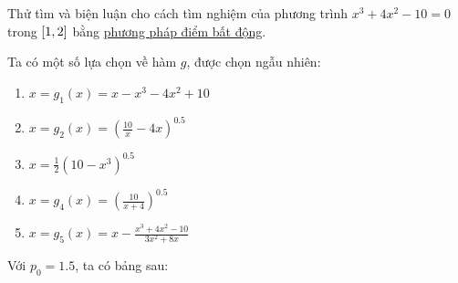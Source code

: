 \documentclass[../../Lectures]{subfiles}
\begin{document}
\begin{exmp}
    Thử tìm và biện luận cho cách tìm nghiệm của phương trình \(x^3 + 4x^2 - 10
    = 0\) trong \(\interval{1}{2}\) bằng \hyperref[method:fixed_point]{phương
    pháp điểm bất động}.

    Ta có một số lựa chọn về hàm \(g\), được chọn ngẫu nhiên:

    \begin{multicols}{2}
        \begin{enumerate}[label = (\alph*)]
            \item \(x = g_1(x) = x - x^3 -4x^2 + 10\)
            \item \(x = g_2(x) = \left(\frac{10}{x} - 4x \right)^{0.5}\)
            \item \(x = \frac{1}{2} (10 - x^3)^{0.5}\)
            \item \(x = g_4(x) = \left(\frac{10}{x + 4} \right)^{0.5}\)
            \item \(x = g_5(x) = x - \frac{x^3 + 4x^2 - 10}{3x^2 + 8x}\)
        \end{enumerate}
    \end{multicols}

    Với \(p_0 = \num{1.5}\), ta có bảng sau:


\end{exmp}
\end{document}
